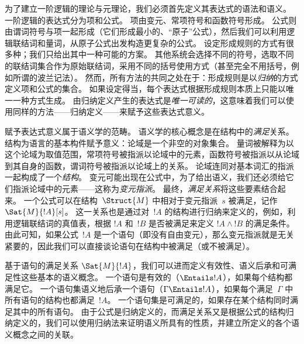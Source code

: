 \documentclass[../../../include/open-logic-section]{subfiles}
\begin{document}


为了建立一阶逻辑的理论与元理论，我们必须首先定义其表达式的语法和语义。
一阶逻辑的表达式分为项和公式。
项由变元、常项符号和函数符号形成。
公式则由谓词符号与项一起形成（它们形成最小的、“原子”公式），然后我们可以利用逻辑联结词和量词，从原子公式出发构造更复杂的公式。
设定形成规则的方式有很多种；我们只给出其中一种可能的方案。
其他系统会选择不同的符号，选取不同的联结词集合作为原始联结词，采用不同的括号使用方式（甚至完全不用括号，例如所谓的波兰记法）。
然而，所有方法的共同之处在于：形成规则是以\emph{归纳}的方式定义项和公式的集合。
如果设定得当，每个表达式根据形成规则本质上只能以唯一一种方式生成。
由归纳定义产生的表达式是\emph{唯一可读的}，这意味着我们可以使用同样的方法——归纳定义——来赋予这些表达式意义。

赋予表达式意义属于语义学的范畴。
语义学的核心概念是在结构中的\emph{满足}关系。
结构为语言的基本构件赋予意义：论域是一个非空的对象集合。
量词被解释为以这个论域为取值范围，常项符号被指派以论域中的元素，函数符号被指派以从论域到其自身的函数，谓词符号被指派以论域上的关系。
论域连同对基本词汇的指派一起构成了一个\emph{结构}。
变元可能出现在公式中，为了给出语义，我们还必须给它们指派论域中的元素——这称为\emph{变元指派}。
最终，\emph{满足关系}将这些要素结合起来。
一个公式可以在结构~$\Struct{M}$ 中相对于变元指派~$s$ 被满足，记作 $\Sat{M}{!A}[s]$。
这一关系也是通过对~$!A$ 的结构进行归纳来定义的，例如，利用逻辑联结词的真值表，根据 $!A$ 和~$!B$ 是否被满足来定义 $!A \land !B$ 的满足条件。
由此可知，如果公式~$!A$ 是一个语句（即没有自由变元），那么变元指派就是无关紧要的，因此我们可以直接谈论语句在结构中被满足（或不被满足）。

基于语句的满足关系 $\Sat{M}{!A}$，我们可以进而定义有效性、语义后承和可满足性这些基本的语义概念。
一个语句是有效的（$\Entails !A$），如果每个结构都满足它。
一个语句集语义地后承一个语句（$\Gamma \Entails !A$），如果每个满足~$\Gamma$ 中所有语句的结构也都满足~$!A$。
一个语句集是可满足的，如果存在某个结构同时满足其中的所有语句。
由于公式是归纳定义的，而满足关系又是根据公式的结构归纳定义的，我们可以使用归纳法来证明语义所具有的性质，并建立所定义的各个语义概念之间的关联。
\end{document}
